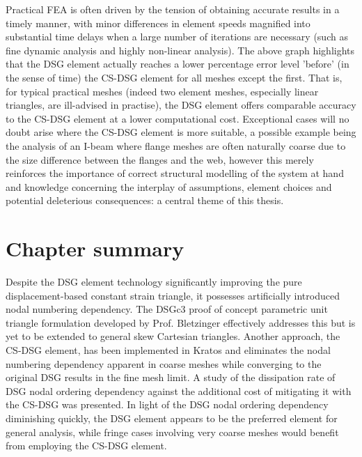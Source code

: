 Practical FEA is often driven by the tension of obtaining accurate results in a timely manner, with minor differences in element speeds magnified into substantial time delays when a large number of iterations are necessary (such as fine dynamic analysis and highly non-linear analysis). The above graph highlights that the DSG element actually reaches a lower percentage error level 'before' (in the sense of time) the CS-DSG element for all meshes except the first. That is, for typical practical meshes (indeed two element meshes, especially linear triangles, are ill-advised in practise), the DSG element offers comparable accuracy to the CS-DSG element at a lower computational cost. Exceptional cases will no doubt arise where the CS-DSG element is more suitable, a possible example being the analysis of an I-beam where flange meshes are often naturally coarse due to the size difference between the flanges and the web, however this merely reinforces the importance of correct structural modelling of the system at hand and knowledge concerning the interplay of assumptions, element choices and potential deleterious consequences: a central theme of this thesis.

\section{Chapter summary}
Despite the DSG element technology significantly improving the pure displacement-based constant strain triangle, it possesses artificially introduced nodal numbering dependency. The DSGc3 proof of concept parametric unit triangle formulation developed by Prof. Bletzinger effectively addresses this but is yet to be extended to general skew Cartesian triangles. Another approach, the CS-DSG element, has been implemented in Kratos and eliminates the nodal numbering dependency apparent in coarse meshes while converging to the original DSG results in the fine mesh limit. A study of the dissipation rate of DSG nodal ordering dependency against the additional cost of mitigating it with the CS-DSG was presented. In light of the DSG nodal ordering dependency diminishing quickly, the DSG element appears to be the preferred element for general analysis, while fringe cases involving very coarse meshes would benefit from employing the CS-DSG element.